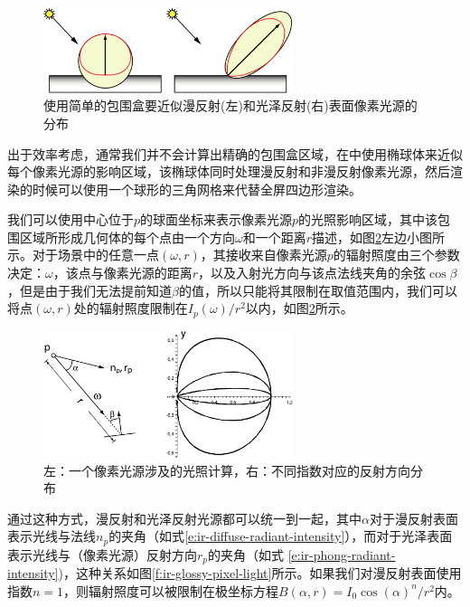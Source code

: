 \begin{figure}
	\sidecaption
		\includegraphics[width=0.65\textwidth]{figures/ir/ir-3-3}
	\caption{使用简单的包围盒要近似漫反射(左)和光泽反射(右)表面像素光源的分布}
	\label{f:ir-bounding-geometry}
\end{figure}


出于效率考虑，通常我们并不会计算出精确的包围盒区域，在\cite{a:SplattingIndirectIllumination}中使用椭球体来近似每个像素光源的影响区域，该椭球体同时处理漫反射和非漫反射像素光源，然后渲染的时候可以使用一个球形的三角网格来代替全屏四边形渲染。

我们可以使用中心位于$p$的球面坐标来表示像素光源$p$的光照影响区域，其中该包围区域所形成几何体的每个点由一个方向$\omega$和一个距离$r$描述，如图\ref{f:ir-pixel-light-region}左边小图所示。对于场景中的任意一点$(\omega,r)$，其接收来自像素光源$p$的辐射照度由三个参数决定：$\omega$，该点与像素光源的距离$r$，以及入射光方向与该点法线夹角的余弦$\cos\beta$，但是由于我们无法提前知道$\beta$的值，所以只能将其限制在取值范围内，我们可以将点$(\omega,r)$处的辐射照度限制在$I_p(\omega)/r^{2}$以内，如图\ref{f:ir-pixel-light-region}所示。

\begin{figure}
	\sidecaption
	\includegraphics[width=0.65\textwidth]{figures/ir/ir-3-6}
	\caption{左：一个像素光源涉及的光照计算，右：不同指数对应的反射方向分布}
	\label{f:ir-pixel-light-region}
\end{figure}

通过这种方式，漫反射和光泽反射光源都可以统一到一起，其中$\alpha$对于漫反射表面表示光线与法线$n_p$的夹角（如式\ref{e:ir-diffuse-radiant-intensity}），而对于光泽表面表示光线与（像素光源）反射方向$r_p$的夹角（如式 \ref{e:ir-phong-radiant-intensity})，这种关系如图\ref{f:ir-glossy-pixel-light}所示。如果我们对漫反射表面使用指数$n = 1$，则辐射照度可以被限制在极坐标方程$B(\alpha,r) = I_0 \cos(\alpha)^{n}/r^{2}$内。

